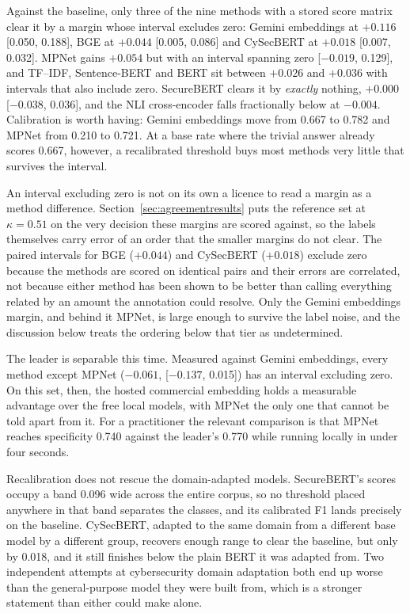 Against the baseline, only three of the nine methods with a stored score matrix
clear it by a margin whose interval excludes zero: Gemini embeddings at $+0.116$
[0.050, 0.188], BGE at $+0.044$ [0.005, 0.086] and CySecBERT at $+0.018$
[0.007, 0.032]. MPNet gains $+0.054$ but with an interval spanning zero
[$-0.019$, 0.129], and TF--IDF, Sentence-BERT and BERT sit between $+0.026$ and
$+0.036$ with intervals that also include zero. SecureBERT clears it by
\emph{exactly} nothing, $+0.000$ [$-0.038$, 0.036], and the NLI cross-encoder
falls fractionally below at $-0.004$. Calibration is worth having: Gemini
embeddings move from 0.667 to 0.782 and MPNet from 0.210 to 0.721. At a base rate
where the trivial answer already scores 0.667, however, a recalibrated threshold
buys most methods very little that survives the interval.

An interval excluding zero is not on its own a licence to read a margin as a
method difference. Section~\ref{sec:agreementresults} puts the reference set at
$\kappa = 0.51$ on the very decision these margins are scored against, so the
labels themselves carry error of an order that the smaller margins do not clear.
The paired intervals for BGE ($+0.044$) and CySecBERT ($+0.018$) exclude zero
because the methods are scored on identical pairs and their errors are correlated,
not because either method has been shown to be better than calling everything
related by an amount the annotation could resolve. Only the Gemini embeddings
margin, and behind it MPNet, is large enough to survive the label noise, and the
discussion below treats the ordering below that tier as undetermined.

The leader is separable this time. Measured against Gemini embeddings, every
method except MPNet ($-0.061$, [$-0.137$, 0.015]) has an interval excluding zero.
On this set, then, the hosted commercial embedding holds a measurable
advantage over the free local models, with MPNet the only one that cannot be told
apart from it. For a practitioner the relevant comparison is that MPNet reaches
specificity 0.740 against the leader's 0.770 while running locally in under four
seconds.

Recalibration does not rescue the domain-adapted models. SecureBERT's scores
occupy a band 0.096 wide across the entire corpus, so no threshold placed
anywhere in that band separates the classes, and its calibrated F1 lands
precisely on the baseline. CySecBERT, adapted to the same domain from a different
base model by a different group, recovers enough range to clear the baseline, but
only by 0.018, and it still finishes below the plain BERT it was adapted from.
Two independent attempts at cybersecurity domain adaptation both end up worse
than the general-purpose model they were built from, which is a stronger
statement than either could make alone.

